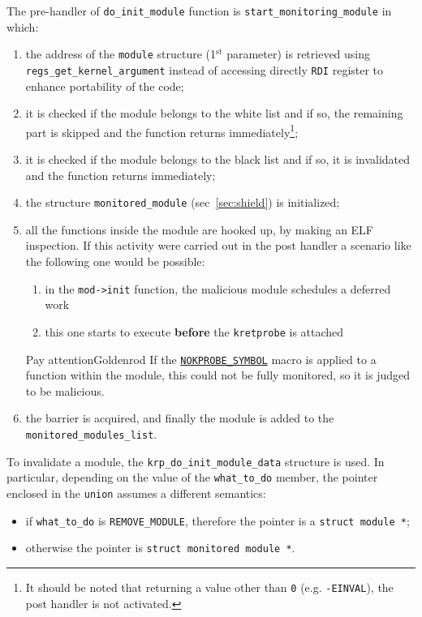 \documentclass{article}
\begin{document}
	The pre-handler of \texttt{do\_init\_module} function is \texttt{start\_monitoring\_module} in which:
	\begin{enumerate}
		\item the address of the \texttt{module} structure (1$^{\text{st}}$ parameter) is retrieved using
		\texttt{regs\_get\_kernel\_argument} instead of accessing directly \texttt{RDI} register to enhance
		portability of the code;
		\item it is checked if the module belongs to the white list and if so, the remaining part is skipped
		and the function returns immediately\footnote{It should be noted that returning a value other than \texttt{0}
		(e.g. \texttt{-EINVAL}), the post handler is not activated.};
		\item it is checked if the module belongs to the black list and if so, it is invalidated and the function
		returns immediately;
		\item the structure \texttt{monitored\_module} (sec~\ref{sec:shield}) is initialized;
		\item all the functions inside the module are hooked up, by making an ELF inspection. If this activity were
		carried out in the post handler	a scenario like the following one would be possible:
		\begin{enumerate}
			\item in the \texttt{mod->init} function, the malicious module schedules a deferred work
			\item this one starts to execute \textbf{before} the \texttt{kretprobe} is attached
		\end{enumerate}

		\begin{custombox}{Pay attention}{Goldenrod}
			If the
			\href{https://elixir.bootlin.com/linux/v5.17/source/include/asm-generic/kprobes.h#L15}{\texttt{NOKPROBE\_SYMBOL}}
			macro is applied to a function within the module, this could not be fully monitored, so it is judged
			to be malicious.
		\end{custombox}
		\item the barrier is acquired, and finally the module is added to the \texttt{monitored\_modules\_list}.
	\end{enumerate}

	To invalidate a module, the \texttt{krp\_do\_init\_module\_data} structure is used. In particular, depending on the
	value of the \texttt{what\_to\_do} member, the pointer enclosed in the \texttt{union} assumes a different semantics:
	\begin{itemize}
		\item if \texttt{what\_to\_do} is \texttt{REMOVE\_MODULE}, therefore the pointer is a \texttt{struct module *};
		\item otherwise the pointer is \texttt{struct monitored module *}.
	\end{itemize}
\end{document}
